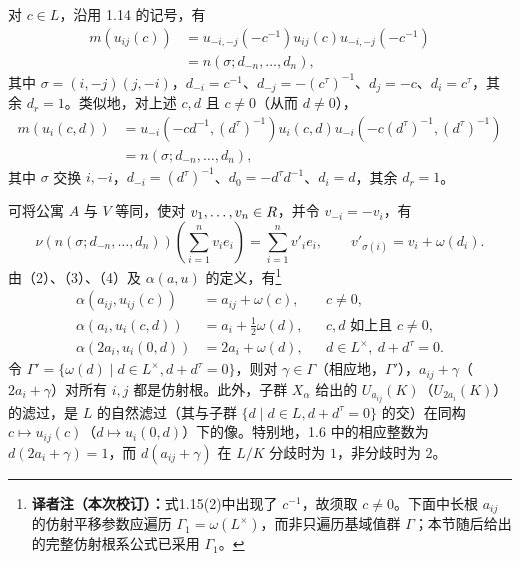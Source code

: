 对 $c\in L$，沿用 1.14 的记号，有
\[
\begin{aligned}
m(u_{ij}(c))&=u_{-i,-j}(-c^{-1})u_{ij}(c)u_{-i,-j}(-c^{-1})\\
&=n(\sigma;d_{-n},\ldots,d_n),
\end{aligned}\tag{1.15(2)}
\]
其中 $\sigma=(i,-j)(j,-i)$，$d_{-i}=c^{-1}$、$d_{-j}=-(c^\tau)^{-1}$、$d_j=-c$、$d_i=c^\tau$，其余 $d_r=1$。类似地，对上述 $c,d$ 且 $c\ne0$（从而 $d\ne0$），
\[
\begin{aligned}
m(u_i(c,d))&=u_{-i}(-cd^{-1},(d^\tau)^{-1})u_i(c,d)
 u_{-i}(-c(d^\tau)^{-1},(d^\tau)^{-1})\\
&=n(\sigma;d_{-n},\ldots,d_n),
\end{aligned}\tag{1.15(3)}
\]
其中 $\sigma$ 交换 $i,-i$，$d_{-i}=(d^\tau)^{-1}$、$d_0=-d^\tau d^{-1}$、$d_i=d$，其余 $d_r=1$。

可将公寓 $A$ 与 $V$ 等同，使对 $v_1,\ldots,v_n\in R$，并令 $v_{-i}=-v_i$，有
\[
\nu(n(\sigma;d_{-n},\ldots,d_n))\left(\sum_{i=1}^nv_ie_i\right)
=\sum_{i=1}^nv'_ie_i,\qquad v'_{\sigma(i)}=v_i+\omega(d_i).\tag{1.15(4)}
\]
由（2）、（3）、（4）及 $\alpha(a,u)$ 的定义，有\nobreak\footnote{\textbf{译者注（本次校订）：}式1.15(2)中出现了 $c^{-1}$，故须取 $c\ne0$。下面中长根 $a_{ij}$ 的仿射平移参数应遍历 $\Gamma_1=\omega(L^\times)$，而非只遍历基域值群 $\Gamma$；本节随后给出的完整仿射根系公式已采用 $\Gamma_1$。}
\[
\begin{aligned}
\alpha(a_{ij},u_{ij}(c))&=a_{ij}+\omega(c),&&c\ne0,\\
\alpha(a_i,u_i(c,d))&=a_i+\tfrac12\omega(d),&&c,d\text{ 如上且 }c\ne0,\\
\alpha(2a_i,u_i(0,d))&=2a_i+\omega(d),&&d\in L^\times,\ d+d^\tau=0.
\end{aligned}
\]
令 $\Gamma'=\{\omega(d)\mid d\in L^\times,d+d^\tau=0\}$，则对 $\gamma\in\Gamma$（相应地，$\Gamma'$），$a_{ij}+\gamma$（$2a_i+\gamma$）对所有 $i,j$ 都是仿射根。此外，子群 $X_\alpha$ 给出的 $U_{a_{ij}}(K)$（$U_{2a_i}(K)$）的滤过，是 $L$ 的自然滤过（其与子群 $\{d\mid d\in L,d+d^\tau=0\}$ 的交）在同构 $c\mapsto u_{ij}(c)$（$d\mapsto u_i(0,d)$）下的像。特别地，1.6 中的相应整数为 $d(2a_i+\gamma)=1$，而 $d(a_{ij}+\gamma)$ 在 $L/K$ 分歧时为 $1$，非分歧时为 $2$。

